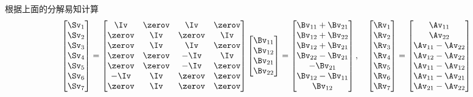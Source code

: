 \documentclass{ctexart}
\begin{document}
根据上面的分解易知计算
\begin{align*}
    \begin{bmatrix}
        \Sv_1 \\ \Sv_2 \\ \Sv_3 \\ \Sv_4 \\ \Sv_5 \\ \Sv_6 \\ \Sv_7
    \end{bmatrix} =
    \begin{bmatrix}
        \Iv    & \zerov & \Iv    & \zerov \\
        \zerov & \Iv    & \zerov & \Iv    \\
        \zerov & \Iv    & \Iv    & \zerov \\
        \zerov & \zerov & -\Iv   & \Iv    \\
        \zerov & \zerov & -\Iv   & \zerov \\
        -\Iv   & \Iv    & \zerov & \zerov \\
        \zerov & \Iv    & \zerov & \zerov
    \end{bmatrix}
    \begin{bmatrix}
        \Bv_{11} \\ \Bv_{12} \\ \Bv_{21} \\ \Bv_{22}
    \end{bmatrix} =
    \begin{bmatrix}
        \Bv_{11} + \Bv_{21} \\ \Bv_{12} + \Bv_{22} \\ \Bv_{12} + \Bv_{21} \\ \Bv_{22} - \Bv_{21} \\ -\Bv_{21} \\ \Bv_{12} - \Bv_{11} \\ \Bv_{12}
    \end{bmatrix}, \quad
    \begin{bmatrix}
        \Rv_1 \\ \Rv_2 \\ \Rv_3 \\ \Rv_4 \\ \Rv_5 \\ \Rv_6 \\ \Rv_7
    \end{bmatrix} =
    \begin{bmatrix}
        \Av_{11} \\ \Av_{22} \\ \Av_{11} - \Av_{22} \\ \Av_{12} - \Av_{22} \\ \Av_{11} - \Av_{12} \\ \Av_{11} - \Av_{21} \\ \Av_{21} - \Av_{22}
    \end{bmatrix}
\end{align*}
\end{document}
